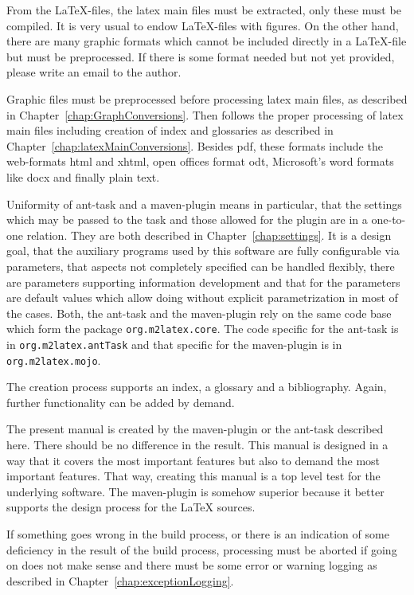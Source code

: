 \documentclass[12pt]{book}
\newcommand{\gls}[1]{#1}
\renewcommand{\index}[1]{ }
\begin{document}
From the \LaTeX-files, the latex main files must be extracted, 
only these must be compiled. 
It is very usual to endow \LaTeX-files with figures. 
On the other hand, there are many graphic formats 
which cannot be included directly in a \LaTeX-file 
but must be preprocessed. 
If there is some format needed but not yet provided, 
please write an email to the author. 

Graphic files must be preprocessed before processing latex main files, 
as described in Chapter~\ref{chap:GraphConversions}. 
Then follows the proper processing of latex main files 
including creation of index and glossaries 
as described in Chapter~\ref{chap:latexMainConversions}. 
Besides \gls{pdf}, these formats include the web-formats \gls{html} 
and \gls{xhtml}, 
open offices format \gls{odt}, Microsoft's word formats like \gls{docx} 
and finally plain text. 

Uniformity of ant-task and a maven-plugin means in particular, 
that the settings which may be passed to the task 
and those allowed for the plugin are in a one-to-one relation. 
They are both described in Chapter~\ref{chap:settings}. 
It is a design goal, that the auxiliary programs 
used by this software are fully configurable via parameters, 
that aspects not completely specified can be handled flexibly, 
there are parameters supporting information development 
and that for the parameters are default values 
which allow doing without explicit parametrization in most of the cases.\index{ant-task}%
Both, the ant-task and the maven-plugin rely on the same code base 
which form the package \texttt{org.m2latex.core}. 
The code specific for the ant-task is in \texttt{org.m2latex.antTask} 
and that specific for the maven-plugin is in \texttt{org.m2latex.mojo}. 


The creation process supports an index, a glossary and a bibliography. 
Again, further functionality can be added by demand. 

The present manual is created by the maven-plugin or the ant-task 
described here. 
There should be no difference in the result. 
This manual is designed in a way that it covers the most important features 
but also to demand the most important features. 
That way, creating this manual is a top level test 
for the underlying software. 
The maven-plugin is somehow superior 
because it better supports the design process for the \LaTeX{} sources. 

If something goes wrong in the build process, 
or there is an indication 
of some deficiency in the result of the build process, 
processing must be aborted if going on does not make sense 
and there must be some error or warning logging 
as described in Chapter~\ref{chap:exceptionLogging}. 
\end{document}
